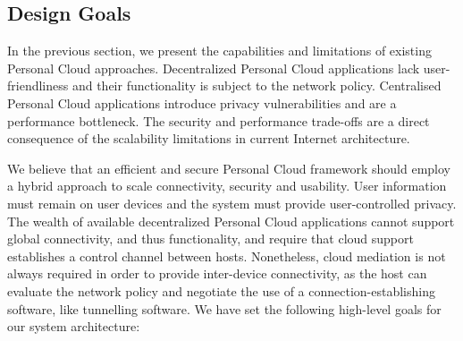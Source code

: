 \begin{itemize}
\end{itemize}

\subsection{Design Goals} \label{sec:sp-challenges}

In the previous section, we present the capabilities and limitations of existing
Personal Cloud approaches. Decentralized Personal Cloud applications lack
user-friendliness and their functionality is subject to the network policy.
Centralised Personal Cloud applications introduce privacy vulnerabilities and
are a performance bottleneck. The security and performance trade-offs are a
direct consequence of the scalability limitations in current Internet
architecture. 

We believe that an efficient and secure Personal Cloud framework should employ a
hybrid approach to scale connectivity, security and usability.  User information
must remain on user devices and the system must provide user-controlled privacy.
The wealth of available decentralized Personal Cloud applications cannot support
global connectivity, and thus functionality, and require that cloud support
establishes a control channel between hosts. Nonetheless, cloud mediation is not
always required in order to provide inter-device connectivity, as the host can evaluate
the network policy and negotiate the use of a connection-establishing software,
like tunnelling software.  We have set the following high-level goals for our system
architecture:

